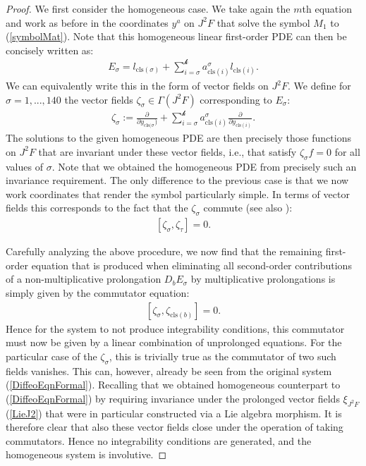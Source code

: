 \begin{proof}
We first consider the homogeneous case. We take again the $m$th equation and work as before in the coordinates $y^a$ on $J^2F$ that solve the symbol $M_1$ to (\ref{symbolMat}). Note that this homogeneous linear first-order PDE can then be concisely written as:
\begin{align}
    E_{\sigma} = l_{\mathrm{cls}(\sigma)} + \sum_{i = \sigma}^{\mathcal{k}} a^{\sigma}_{\mathrm{cls}(i)} l_{\mathrm{cls}(i) } .
\end{align}
We can equivalently write this in the form of vector fields on $J^2F$. We define for $\sigma = 1,...,140$ the vector fields $\zeta_{\sigma} \in \Gamma(J^2F) $ corresponding to $E_{\sigma}$:
\begin{align}
    \zeta_{\sigma} := \frac{\partial}{\partial y_{\mathrm{cls}(\sigma})} + \sum_{i = \sigma}^{\mathcal{k}} a^{\sigma}_{\mathrm{cls}(i)} \frac{\partial}{\partial y_{\mathrm{cls}(i)}}.
\end{align}
The solutions to the given homogeneous PDE are then precisely those functions on $J^2F$ that are invariant under these vector fields, i.e., that satisfy $\zeta_{\sigma} f = 0$ for all values of $\sigma$.
Note that we obtained the homogeneous PDE from precisely such an invariance requirement. The only difference to the previous case is that we now work coordinates that render the symbol particularly simple. 
In terms of vector fields this corresponds to the fact that the $\zeta_{\sigma}$ commute (see also \cite{seiler1994analysis}):
\begin{align}
    \left [ \zeta_{\sigma}, \zeta_{\tau}\right ] =0.
\end{align}

Carefully analyzing the above procedure, we now find that the remaining first-order equation that is produced when eliminating all second-order contributions of a non-multiplicative prolongation $D_bE_{\sigma}$ by multiplicative prolongations is simply given by the commutator equation:
\begin{align}
    \left [\zeta_{\sigma}, \zeta_{\mathrm{cls}(b)} \right] = 0.
\end{align}
Hence for the system to not produce integrability conditions, this commutator must now be given by a linear combination of unprolonged equations. For the particular case of the $\zeta_{\sigma}$, this is trivially true as the commutator of two such fields vanishes. This can, however, already be seen from the original system (\ref{DiffeoEqnFormal}).
Recalling that we obtained homogeneous counterpart to (\ref{DiffeoEqnFormal}) by requiring invariance under the prolonged vector fields $\xi_{J^2F}$ (\ref{LieJ2}) that were in particular constructed via a Lie algebra morphism. It is therefore clear that also these vector fields close under the operation of taking commutators. Hence no integrability conditions are generated, and the homogeneous system is involutive.


\end{proof}

